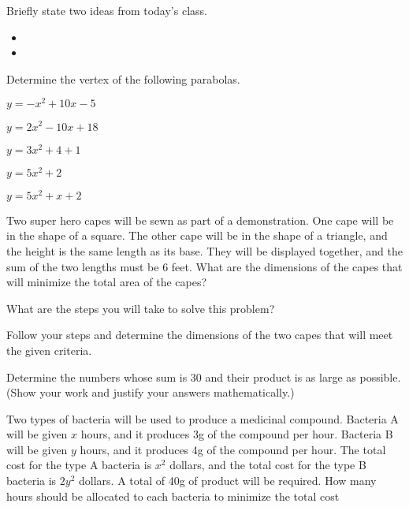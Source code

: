 \begin{problem}
\item Briefly state two ideas from today's class.
  \begin{itemize}
  \item
  \item
  \end{itemize}

\item Determine the vertex of the following parabolas.
  \begin{subproblem}
  \item $y=-x^2+10x-5$
  \item $y=2x^2-10x+18$
  \item $y=3x^2+4+1$
  \item $y=5x^2+2$
  \item $y=5x^2+x+2$
  \end{subproblem}

\item Two super hero capes will be sewn as part of a
  demonstration. One cape will be in the shape of a square. The other
  cape will be in the shape of a triangle, and the height is the same
  length as its base. They will be displayed together, and the sum of
  the two lengths must be 6 feet. What are the dimensions of the capes
  that will minimize the total area of the capes?
  \begin{subproblem}
  \item What are the steps you will take to solve this problem?
  \item Follow your steps and determine the dimensions of the two
    capes that will meet the given criteria.
  \end{subproblem}

\item Determine the numbers whose sum is 30 and their product is as
  large as possible. (Show your work and justify your answers
  mathematically.)

\item Two types of bacteria will be used to produce a medicinal
  compound. Bacteria A will be given $x$ hours, and it produces 3g of
  the compound per hour. Bacteria B will be given $y$ hours, and it
  produces 4g of the compound per hour. The total cost for the type A
  bacteria is $x^2$ dollars, and the total cost for the type B
  bacteria is $2y^2$ dollars. A total of 40g of product will be
  required. How many hours should be allocated to each bacteria to
  minimize the total cost


\end{problem}
